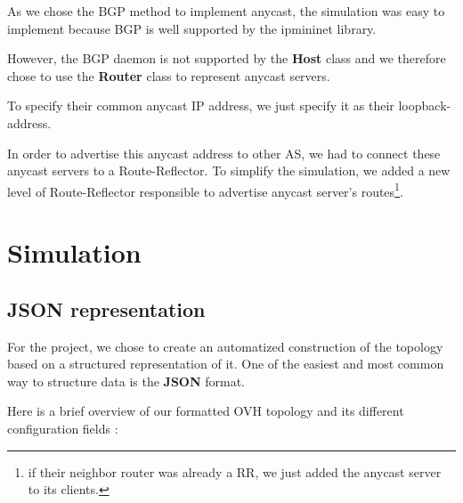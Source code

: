 \documentclass[letter, 9pt, conference]{ieeeconf}
\begin{document}
As we chose the BGP method to implement anycast, the simulation was easy to implement because BGP is well supported by the ipmininet library. 

However, the BGP daemon is not supported by the \textbf{Host} class and we therefore chose to use the \textbf{Router} class to represent anycast servers. 

To specify their common anycast IP address, we just specify it as their loopback-address. 

In order to advertise this anycast address to other AS, we had to connect these anycast servers to a Route-Reflector. To simplify the simulation, we added a new level of Route-Reflector responsible to advertise anycast server's routes\footnote{if their neighbor router was already a RR, we just added the anycast server to its clients.}. 

\section{Simulation}
\label{sec:simulation}

\subsection{JSON representation}
\label{sec:json}

For the project, we chose to create an automatized construction of the topology based on a structured representation of it. One of the easiest and most common way to structure data is the \textbf{JSON} format. 

Here is a brief overview of our formatted OVH topology and its different configuration fields :
\end{document}
